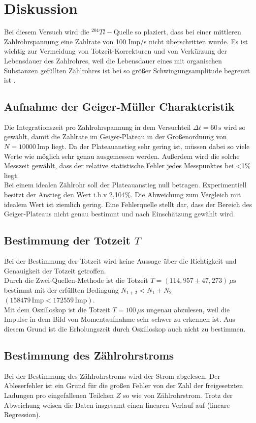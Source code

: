 \section{Diskussion}
Bei diesem Versuch wird die $^{204} Tl-\text{Quelle}$ so plaziert, dass bei einer mittleren Zahlrohrspannung eine Zahlrate von 100 Imp/s nicht überschritten wurde.
Es ist wichtig zur Vermeidung von Totzeit-Korrekturen und von Verkürzung der Lebensdauer des Zahlrohres, weil die Lebensdauer eines mit organischen Substanzen gefüllten Zählrohres ist bei so grö\ss er Schwingungsamplitude begrenzt ist .

\subsection{Aufnahme der Geiger-Müller Charakteristik}
Die  Integrationszeit  pro  Zahlrohrspannung  in dem Versuchteil \( \Delta t=60\,\text{s}\) wird so gewählt, damit die Zahlrate im Geiger-Plateau in der Großenordnung von \(N=10000\, \mathrm{Imp}\) liegt. 
Da der Plateauanstieg sehr gering ist, müssen dabei so viele Werte wie möglich sehr genau ausgemessen werden. Au\ss erdem wird die solche Messzeit gewählt, dass der relative statistische Fehler jedes Messpunktes bei <1\% liegt.\\
Bei einem idealen Zählrohr soll der Plateauanstieg null betragen.
Experimentiell besitzt der Anstieg den Wert i.h.v 2,104\%. Die Abweichung zum Vergleich mit idealem Wert ist ziemlich gering. 
Eine Fehlerquelle stellt dar, dass der Bereich des Geiger-Plateaus nicht genau bestimmt und nach Einschätzung gewählt wird.

\subsection{Bestimmung der Totzeit $T$}
Bei der Bestimmung der Totzeit wird keine Aussage über die Richtigkeit und Genauigkeit der Totzeit getroffen.\\ 
Durch die Zwei-Quellen-Methode ist die Totzeit \( T =(114,957 \pm 47,273)\,\mu \text{s}\) bestimmt mit der erfüllten Bedingung \({N}_{1+2} < {N}_1 + {N}_2\) \( (158479 \,\text{Imp} < 172559\,\text{Imp}) \).\\
Mit dem Oszilloskop ist die Totzeit $T=100\,\mu \text{s}$ ungenau abzulesen, weil die Impulse in dem Bild von Momentaufnahme sehr schwer zu erkennen ist. 
Aus diesem Grund ist die Erholungszeit durch Oszilloskop auch nicht zu bestimmen.

\subsection{Bestimmung des Zählrohrstroms}
Bei der Bestimmung des Zählrohrstroms wird der Strom abgelesen. Der Ableserfehler ist ein Grund für die gro\ss en Fehler von der Zahl der freigesetzten Ladungen pro eingefallenen Teilchen $Z$ so wie von Zählrohrstrom.
Trotz der Abweichung weisen die Daten insgesamt einen linearen Verlauf auf (lineare Regression).

\label{sec:Diskussion}